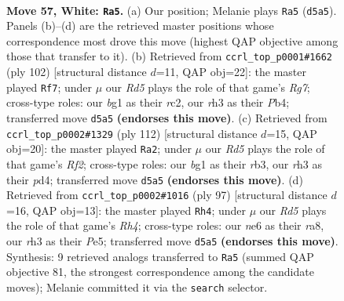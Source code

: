 \documentclass[11pt]{article}
\begin{document}
\clearpage

\begin{figure}[p]\centering
\begin{subfigure}{0.46\textwidth}\centering
\resizebox{\linewidth}{!}{%
\newchessgame
\chessboard[
  setfen={5k2/8/3Nn3/3R2P1/P7/7r/8/4K1b1 w - - 4 57},
  showmover=false,
  pgfstyle=straightmove, color=movearrow, markmove={d5-a5}
]}
\caption{}
\end{subfigure}\hfill
\begin{subfigure}{0.46\textwidth}\centering
\resizebox{\linewidth}{!}{%
\newchessgame
\chessboard[
  setfen={8/6R1/8/1p2k1PP/1P6/5n2/2r5/5K2 w - - 3 52},
  showmover=false,
  pgfstyle=straightmove, color=movearrow, markmove={g7-f7}
]}
\caption{}
\end{subfigure}
\\[4pt]
\begin{subfigure}{0.46\textwidth}\centering
\resizebox{\linewidth}{!}{%
\newchessgame
\chessboard[
  setfen={6k1/8/8/7n/P2p1P1N/1r6/5R2/6K1 w - - 0 57},
  showmover=false,
  pgfstyle=straightmove, color=movearrow, markmove={f2-a2}
]}
\caption{}
\end{subfigure}\hfill
\begin{subfigure}{0.46\textwidth}\centering
\resizebox{\linewidth}{!}{%
\newchessgame
\chessboard[
  setfen={R7/8/1k4p1/p3p2r/4N3/8/5K2/8 b - - 6 49},
  showmover=false,
  pgfstyle=straightmove, color=movearrow, markmove={h5-h4}
]}
\caption{}
\end{subfigure}
\caption{\textbf{Move 57, White: \texttt{Ra5}.} (a) Our position; Melanie plays \texttt{Ra5} (\texttt{d5a5}). Panels (b)--(d) are the retrieved master positions whose correspondence most drove this move (highest QAP objective among those that transfer to it). (b) Retrieved from \texttt{ccrl\_top\_p0001\#1662} (ply 102) [structural distance $d$=11, QAP obj=22]: the master played \texttt{Rf7}; under $\mu$ our \emph{Rd5} plays the role of that game's \emph{Rg7}; cross-type roles: our \emph{b}g1 as their \emph{r}c2, our \emph{r}h3 as their \emph{P}b4; transferred move \texttt{d5a5} \textbf{(endorses this move)}. (c) Retrieved from \texttt{ccrl\_top\_p0002\#1329} (ply 112) [structural distance $d$=15, QAP obj=20]: the master played \texttt{Ra2}; under $\mu$ our \emph{Rd5} plays the role of that game's \emph{Rf2}; cross-type roles: our \emph{b}g1 as their \emph{r}b3, our \emph{r}h3 as their \emph{p}d4; transferred move \texttt{d5a5} \textbf{(endorses this move)}. (d) Retrieved from \texttt{ccrl\_top\_p0002\#1016} (ply 97) [structural distance $d$=16, QAP obj=13]: the master played \texttt{Rh4}; under $\mu$ our \emph{Rd5} plays the role of that game's \emph{Rh4}; cross-type roles: our \emph{n}e6 as their \emph{r}a8, our \emph{r}h3 as their \emph{P}e5; transferred move \texttt{d5a5} \textbf{(endorses this move)}. Synthesis: 9 retrieved analogs transferred to \texttt{Ra5} (summed QAP objective 81, the strongest correspondence among the candidate moves); Melanie committed it via the \texttt{search} selector.}
\label{fig:thought-m112}
\end{figure}
\end{document}
